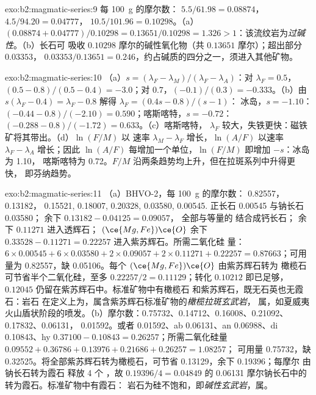 \begin{solution}{exo:b2:magmatic-series:9}
每 \qty{100}{g} 的摩尔数： $5.5/61.98 = 0.08874$， $4.5/94.20 =
0.04777$， $10.5/101.96 = 0.10298$。（a）$(0.08874 + 0.04777)/0.10298 =
0.13651/0.10298 = 1.326 > 1$：该流纹岩为\emph{过碱性}。（b）长石可
吸收 $0.10298$ 摩尔的碱性氧化物（共 $0.13651$ 摩尔）；超出部分 $0.03353$，
$0.03353/0.13651 = 0.246$，约占碱质的四分之一，须进入其他矿物。
\end{solution}

\begin{solution}{exo:b2:magmatic-series:10}
（a）$s = (\lambda_F - \lambda_M)/(\lambda_F - \lambda_A)$：对 $\lambda_F = 0.5$，$(0.5
- 0.8)/(0.5 - 0.4) = -3.0$；对 $0.7$，$(-0.1)/(0.3) = -0.333$。（b）由
$s(\lambda_F - 0.4) = \lambda_F - 0.8$ 解得 $\lambda_F = (0.4s - 0.8)/(s - 1)$：
冰岛，$s = -1.10$：$(-0.44 - 0.8)/(-2.10) = 0.590$；喀斯喀特，$s = -0.72$：
$(-0.288 - 0.8)/(-1.72) = 0.633$。（c）喀斯喀特，
$\lambda_F$ 较大，失铁更快：磁铁矿将其带出。（d）$\ln(F/M)$ 以
速率 $\lambda_M - \lambda_F$ 增长，$\ln(A/F)$ 以速率 $\lambda_F - \lambda_A$ 增长；因此
$\ln(A/F)$ 每增加一个单位，$\ln(F/M)$ 即增加 $-s$：冰岛为 1.10，
喀斯喀特为 0.72。$F/M$ 沿两条趋势均上升，但在拉斑系列中升得更快，
即芬纳趋势。
\end{solution}

\begin{solution}{exo:b2:magmatic-series:11}
（a）BHVO-2，每 \qty{100}{g} 的摩尔数： 0.82557， 0.13182，
0.15521,  0.18007,  0.20328,  0.03580,  0.00545.
正长石 0.00545 与钠长石 0.03580； 余下 $0.13182 - 0.04125 = 0.09057$，
全部与等量的  结合成钙长石； 余下 $0.11271$ 进入透辉石；
$(\ce{Mg,Fe})\ce{O}$ 余下 $0.33528 - 0.11271 = 0.22257$ 进入紫苏辉石。所需二氧化硅
量：$6\times0.00545 + 6\times0.03580 + 2\times0.09057 + 2\times0.11271 + 0.22257 =
0.87663$；可用量为 0.82557，缺 0.05106。每个 $(\ce{Mg,Fe})\ce{O}$ 由紫苏辉石转为
橄榄石可节省半个二氧化硅，至多 $0.22257/2 = 0.11129$；转化
$0.10212$ 即已足够，$0.12045$ 仍留在紫苏辉石中。标准矿物中有橄榄石
和紫苏辉石，既无石英也无霞石：岩石
在定义上为，属含紫苏辉石标准矿物的\emph{橄榄拉斑玄武岩}，
属，如夏威夷火山盾状阶段的喷发。（b）摩尔数：0.75732、0.14712、0.16008、0.21092、0.17832、0.06131，
0.01592。或者 0.01592、ab 0.06131、an 0.06988、di 0.10843、hy $0.37100 - 0.10843 =
0.26257$；所需二氧化硅量 $0.09552 + 0.36786 + 0.13976 + 0.21686 + 0.26257 = 1.08257$；
可用量 0.75732，缺 0.32525。将全部紫苏辉石转为橄榄石，可节省
0.13129，余下 0.19396；每摩尔  由钠长石转为霞石
释放 4 个 ，故 $0.19396/4 = 0.04849$
的 0.06131 摩尔钠长石中的  转为霞石。标准矿物中有霞石：
岩石为硅不饱和，即\emph{碱性玄武岩}，属。
\end{solution}

